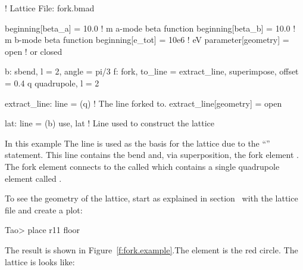 \documentclass{hitec}     %
\begin{document}
\begin{code}
! Lattice File: fork.bmad

beginning[beta_a] = 10.0        ! m  a-mode beta function
beginning[beta_b] = 10.0        ! m  b-mode beta function
beginning[e_tot] = 10e6         ! eV 
parameter[geometry] = open      ! or closed

b: sbend, l = 2, angle = pi/3
f: fork, to_line = extract_line, superimpose, offset = 0.4
q quadrupole, l = 2

extract_line: line = (q)       ! The line forked to.
extract_line[geometry] = open

lat: line = (b)
use, lat                ! Line used to construct the lattice
\end{code}

In this example The  line is used as the basis for the lattice due to the ``''
statement.  This line contains the bend  and, via superposition, the fork element . The
fork element  connects to the  called  which contains a single 
quadrupole element called . 

To see the geometry of the lattice, start \tao as explained in section~ with the
lattice file  and create a  plot:
\begin{code}
Tao> place r11 floor
\end{code}

The result is shown in Figure~\ref{f:fork.example}.The  element is the red circle.
The lattice is looks like:
\end{document}
